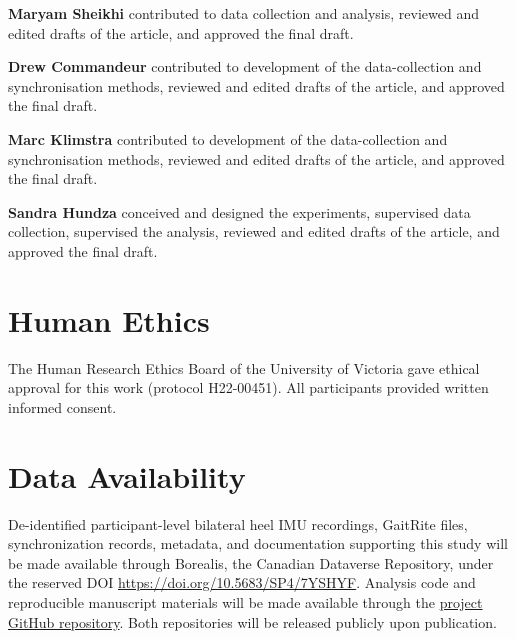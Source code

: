 \documentclass[11pt]{article}
\begin{document}
\textbf{Maryam Sheikhi} contributed to data collection and analysis, reviewed and edited drafts of the article, and approved the final draft.

\textbf{Drew Commandeur} contributed to development of the data-collection and synchronisation methods, reviewed and edited drafts of the article, and approved the final draft.

\textbf{Marc Klimstra} contributed to development of the data-collection and synchronisation methods, reviewed and edited drafts of the article, and approved the final draft.

\textbf{Sandra Hundza} conceived and designed the experiments, supervised data collection, supervised the analysis, reviewed and edited drafts of the article, and approved the final draft.

\section*{Human Ethics}

The Human Research Ethics Board of the University of Victoria gave ethical approval for this work (protocol H22-00451). All participants provided written informed consent.

\section*{Data Availability}

De-identified participant-level bilateral heel IMU recordings, GaitRite files, synchronization records, metadata, and documentation supporting this study will be made available through Borealis, the Canadian Dataverse Repository, under the reserved DOI \url{https://doi.org/10.5683/SP4/7YSHYF}. Analysis code and reproducible manuscript materials will be made available through the \href{https://github.com/pkudzia/manuscript-heel-imu-stride-length-validation}{project GitHub repository}. Both repositories will be released publicly upon publication.


\clearpage


\end{document}
